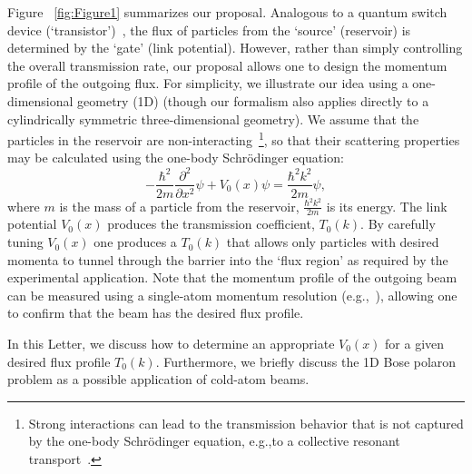 \documentclass[twocolumn,amsmath,amssymb,showpacs,prl,superscriptaddress,aps]{revtex4-1}
\begin{document}
Figure ~\ref{fig:Figure1} summarizes our proposal. Analogous to a quantum switch device (`transistor')~\cite{zoller2004, marchukov2016}, the flux of particles from the `source' (reservoir) is determined by the `gate' (link potential). However, rather than simply controlling the overall transmission rate, our proposal allows one to design the momentum profile of the outgoing flux. For simplicity, we illustrate our idea using a one-dimensional geometry (1D) (though our formalism also applies directly to a cylindrically symmetric three-dimensional geometry). We assume that the particles in the reservoir are non-interacting~\footnote{Strong interactions can lead to the transmission behavior that is not captured by the one-body Schr{\"o}dinger equation, e.g.,to a collective resonant transport~\cite{Schlagheck2005}.}, so that their scattering properties may be calculated using the one-body Schr{\"o}dinger equation:
\begin{equation}
-\frac{\hbar^2}{2m}\frac{\partial^2}{\partial x^2}\psi+V_0(x)\psi=\frac{\hbar^2k^2}{2m}\psi,
\label{eq:schr}
\end{equation}
where $m$ is the mass of a particle from the reservoir, $\frac{\hbar^2k^2}{2m}$ is its energy. The link potential $V_0(x)$ produces the transmission coefficient, $T_0(k)$. By carefully tuning $V_0(x)$ one produces a $T_0(k)$ that allows only particles with desired momenta to tunnel through the barrier into the `flux region' as required by the experimental application. Note that the momentum profile of the outgoing beam can be measured using a single-atom momentum resolution (e.g.,~\cite{jochim2018}), allowing one to confirm that the beam has the desired flux profile.

In this Letter,  we discuss how to determine an appropriate $V_0(x)$ for a given desired flux profile $T_0(k)$. Furthermore, we briefly discuss the 1D Bose polaron problem as a possible application of cold-atom beams. 
\end{document}
